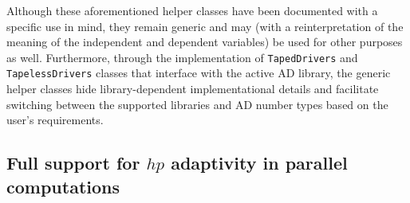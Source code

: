 \documentclass{ansarticle-preprint}
\begin{document}
Although these aforementioned helper classes have been documented with a specific
use in mind, they remain generic and may (with a reinterpretation of the meaning of
the independent and dependent variables) be used for other purposes as well.
Furthermore, through the implementation of \texttt{TapedDrivers} and 
\texttt{TapelessDrivers} classes that interface with the active AD library, the 
generic helper classes hide library-dependent implementational details and facilitate 
switching between the supported libraries and AD number types based on the 
user's requirements.

\subsection{Full support for $hp$ adaptivity in parallel computations}
\label{subsec:hp}
\end{document}
